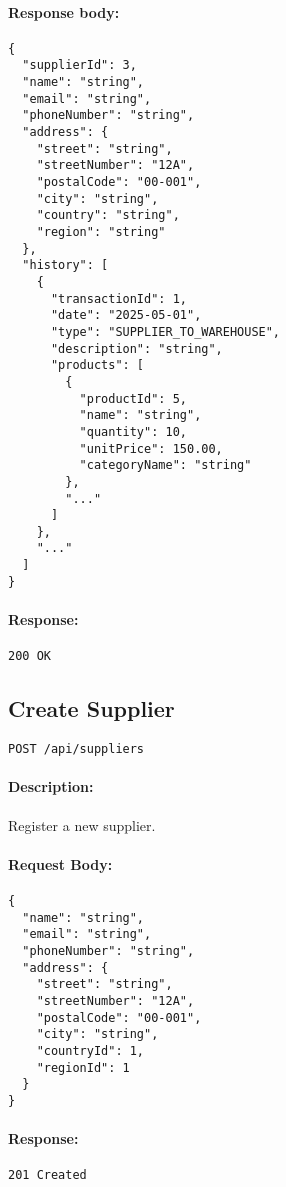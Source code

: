 \documentclass[a4paper,11pt]{article}
\begin{document}
\paragraph{Response body:}
\begin{verbatim}
{
  "supplierId": 3,
  "name": "string",
  "email": "string",
  "phoneNumber": "string",
  "address": {
    "street": "string",
    "streetNumber": "12A",
    "postalCode": "00-001",
    "city": "string",
    "country": "string",
    "region": "string"
  },
  "history": [
    {
      "transactionId": 1,
      "date": "2025-05-01",
      "type": "SUPPLIER_TO_WAREHOUSE",
      "description": "string",
      "products": [
        {
          "productId": 5,
          "name": "string",
          "quantity": 10,
          "unitPrice": 150.00,
          "categoryName": "string"
        },
        "..."
      ]
    },
    "..."
  ]
}
\end{verbatim}
\paragraph{Response:} \texttt{200 OK}

\subsection{Create Supplier}
\label{sec:suppliers-create}
\begin{verbatim}
POST /api/suppliers
\end{verbatim}
\paragraph{Description:} Register a new supplier.
\paragraph{Request Body:}
\begin{verbatim}
{
  "name": "string",
  "email": "string",
  "phoneNumber": "string",
  "address": {
    "street": "string",
    "streetNumber": "12A",
    "postalCode": "00-001",
    "city": "string",
    "countryId": 1,
    "regionId": 1
  }
}
\end{verbatim}
\paragraph{Response:} \texttt{201 Created}

\end{document}
